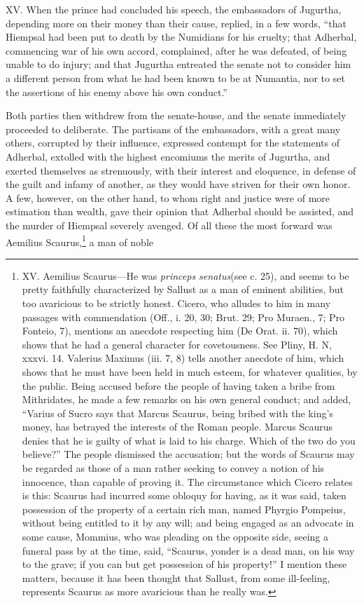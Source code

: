 XV. When the prince had concluded his speech, the embassadors of
Jugurtha, depending more on their money than their cause, replied, in
a few words, ``that Hiempsal had been put to death by the Numidians for
his cruelty; that Adherbal, commencing war of his own accord, complained,
after he was defeated, of being unable to do injury; and that Jugurtha
entreated the senate not to consider him a different person from what
he had been known to be at Numantia, nor to set the assertions of his
enemy above his own conduct.''

Both parties then withdrew from the senate-house, and the senate
immediately proceeded to deliberate. The partisans of the embassadors,
with a great many others, corrupted by their influence, expressed
contempt for the statements of Adherbal, extolled with the highest
encomiums the merits of Jugurtha, and exerted themselves as
strenuously, with their interest and eloquence, in defense of the
guilt and infamy of another, as they would have striven for their own
honor. A few, however, on the other hand, to whom right and justice
were of more estimation than wealth, gave their opinion that Adherbal
should be assisted, and the murder of Hiempsal severely avenged. Of
all these the most forward was Aemilius Scaurus,\footnote{XV. Aemilius Scaurus—He was \emph{princeps senatus}(see c. 25),
and seems to be pretty faithfully characterized by Sallust as a man of
eminent abilities, but too avaricious to be strictly honest. Cicero,
who alludes to him in many passages with commendation (Off., i. 20,
30; Brut. 29; Pro Muraen., 7; Pro Fonteio, 7), mentions an anecdote
respecting him (De Orat. ii. 70), which shows that he had a general
character for covetousness. See Pliny, H. N, xxxvi. 14. Valerius
Maximus (iii. 7, 8) tells another anecdote of him, which shows that he
must have been held in much esteem, for whatever qualities, by the
public. Being accused before the people of having taken a bribe from
Mithridates, he made a few remarks on his own general conduct; and
added, ``Varius of Sucro says that Marcus Scaurus, being bribed with
the king's money, has betrayed the interests of the Roman people.
Marcus Scaurus denies that he is guilty of what is laid to his charge.
Which of the two do you believe?'' The people dismissed the accusation;
but the words of Scaurus may be regarded as those of a man rather
seeking to convey a notion of his innocence, than capable of proving
it. The circumstance which Cicero relates is this: Scaurus had
incurred some obloquy for having, as it was said, taken possession of
the property of a certain rich man, named Phyrgio Pompeius, without
being entitled to it by any will; and being engaged as an advocate in
some cause, Mommius, who was pleading on the opposite side, seeing a
funeral pass by at the time, said, ``Scaurus, yonder is a dead man, on
his way to the grave; if you can but get possession of his property!''
I mention these matters, because it has been thought that Sallust,
from some ill-feeling, represents Scaurus as more avaricious than he
really was.} a man of noble
